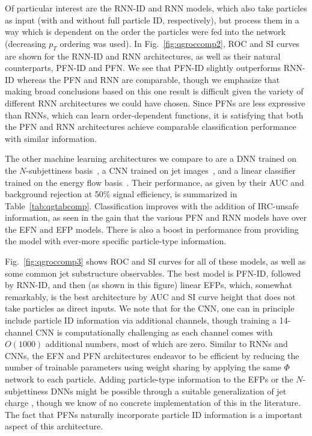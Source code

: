 \documentclass[letterpaper,11pt]{article}
\DeclareRobustCommand{\Tab}[1]{Table~\ref{#1}}
\DeclareRobustCommand{\Fig}[1]{Fig.~\ref{#1}}
\begin{document}
Of particular interest are the RNN-ID and RNN models, which also take particles as input (with and without full particle ID, respectively), but process them in a way which is dependent on the order the particles were fed into the network (decreasing $p_T$ ordering was used).
%
In \Fig{fig:qgroccomp2}, ROC and SI curves are shown for the RNN-ID and RNN architectures, as well as their natural counterparts, PFN-ID and PFN.
%
We see that PFN-ID slightly outperforms RNN-ID whereas the PFN and RNN are comparable, though we emphasize that making broad conclusions based on this one result is difficult given the variety of different RNN architectures we could have chosen.
%
Since PFNs are less expressive than RNNs, which can learn order-dependent functions, it is satisfying that both the PFN and RNN architectures achieve comparable classification performance with similar information.




The other machine learning architectures we compare to are a DNN trained on the $N$-subjettiness basis~\cite{Thaler:2010tr,Thaler:2011gf,Datta:2017rhs}, a CNN trained on jet images~\cite{Cogan:2014oua,deOliveira:2015xxd,Komiske:2016rsd}, and a linear classifier trained on the energy flow basis~\cite{Komiske:2017aww}.
%
Their performance, as given by their AUC and background rejection at 50\% signal efficiency, is summarized in \Tab{tab:qgtabcomp}.
%
Classification improves with the addition of IRC-unsafe information, as seen in the gain that the various PFN and RNN models have over the EFN and EFP models.
%
There is also a boost in performance from providing the model with ever-more specific particle-type information.


%
\Fig{fig:qgroccomp3} shows ROC and SI curves for all of these models, as well as some common jet substructure observables.
%
The best model is PFN-ID, followed by RNN-ID, and then (as shown in this figure) linear EFPs, which, somewhat remarkably, is the best architecture by AUC and SI curve height that does not take particles as direct inputs.
%
We note that for the CNN, one can in principle include particle ID information via additional channels, though training a 14-channel CNN is computationally challenging as each channel comes with $O(1000)$ additional numbers, most of which are zero.
%
Similar to RNNs and CNNs, the EFN and PFN architectures endeavor to be efficient by reducing the number of trainable parameters using weight sharing by applying the same $\Phi$ network to each particle.
%
Adding particle-type information to the EFPs or the $N$-subjettiness DNNs might be possible through a suitable generalization of jet charge \cite{Krohn:2012fg}, though we know of no concrete implementation of this in the literature.
%
The fact that PFNs naturally incorporate particle ID information is a important aspect of this architecture.
\end{document}
